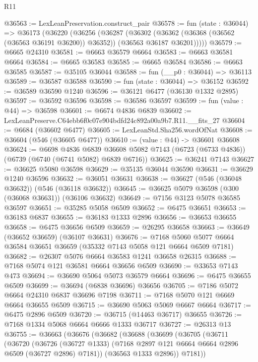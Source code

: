 \begin{lexlean}{R11}
\begin{coremodule}
@36563 := LexLeanPreservation.construct_pair
@36578 := fun (state : @36044) =>
  @36173
    (@36220
      (@36256
        (@36287
          (@36302
            (@36362 (@36368 (@36562 (@36563 @36191 @36200)) @36352))
            (@36563 @36187 @36201)))))
@36579 := @6665 @24310
@36581 := @6663 @36579 @6664
@36583 := @6663 @36581 @6664
@36584 := @6665 @36583
@36585 := @6665 @36584
@36586 := @6663 @36585
@36587 := @35105 @36044
@36588 := fun (__p0 : @36044) => @36113
@36589 := @36587 @36588
@36590 := fun (state : @36044) => @36152
@36592 := @36589 @36590 @1240
@36596 := @36121 @6477 (@36130 @1332 @2895)
@36597 := @36592 @36596
@36598 := @36586 @36597
@36599 := fun (value : @44) => @36598
@36601 := @6674 @4836 @6839
@36602 := LexLeanPreserve.C64ebb6f0c07e904bdfd24c892a00a9b7.R11.__fits_27
@36604 := @6684 (@36602 @6477)
@36605 := LexLeanStd.Sha256.wordOfNat
@36608 := @36604 (@546 (@36605 @6477))
@36610 := (value : @44) -> @36601 @36608
@36624 := @6698
    @4836
    @6839
    @36608
    @5082
    @7143
    (@6723 (@6733 @4836))
    (@6739 (@6740 (@6741 @5082) @6839 @6716))
@36625 := @36241 @7143
@36627 := @36625 @5080 @36598
@36629 := @35135 @36044 @36590
@36631 := @36629 @1240 @36596
@36632 := @36051 @36631
@36638 := @36627 (@546 (@36048 @36632)) (@546 (@36118 @36632))
@36645 := @36625 @5079 @36598 (@300 (@36068 @36631)) (@36106 @36632)
@36649 := @7156 @3123 @5078 @36585 @36597
@36651 := @35285 @5058 @6509
@36652 := @6475 @36651
@36653 := @36183 @6837
@36655 := @36183 @1333 @2896
@36656 := @36653 @36655
@36658 := @6475 @36656 @6509
@36659 := @26295 @36658
@36663 := @36649 (@36652 @36659) (@36107 @36631)
@36676 := @7168 @5060 @5077 @6664 @36584 @36651 @36659 (@35332 @7143 @5058 @121 @6664 @6509 @7181)
@36682 := @26307 @5076 @6664 @36583 @1241 @36658 @26315
@36688 := @7168 @5074 @121 @36581 @6664 @36656 @6509
@36690 := @33653 @7143 @473
@36694 := @36690 @5064 @5073 @36579 @6664
@36696 := @6475 @36655 @6509
@36699 := @36694 (@6838 @36696) @36656
@36705 := @7186 @5072 @6664 @24310 @6837 @36696 @7198
@36711 := @7168 @5070 @121 @6669 @6664 @36655 @6509
@36715 := @36690 @5063 @5069 @6667 @6664
@36717 := @6475 @2896 @6509
@36720 := @36715 (@14463 @36717) @36655
@36726 := @7168 @1334 @5068 @6664 @6666 @1333 @36717
@36727 := @26313 @13
@36755 := @36663
    (@36676
      (@36682
        (@36688
          (@36699
            (@36705
              (@36711
                (@36720
                  (@36726
                    (@36727 @1333)
                    (@7168 @2897 @121 @6664 @6664 @2896 @6509 (@36727 @2896) @7181))
                  (@36563 @1333 @2896))
                @7181))

\end{coremodule}
\end{lexlean}
